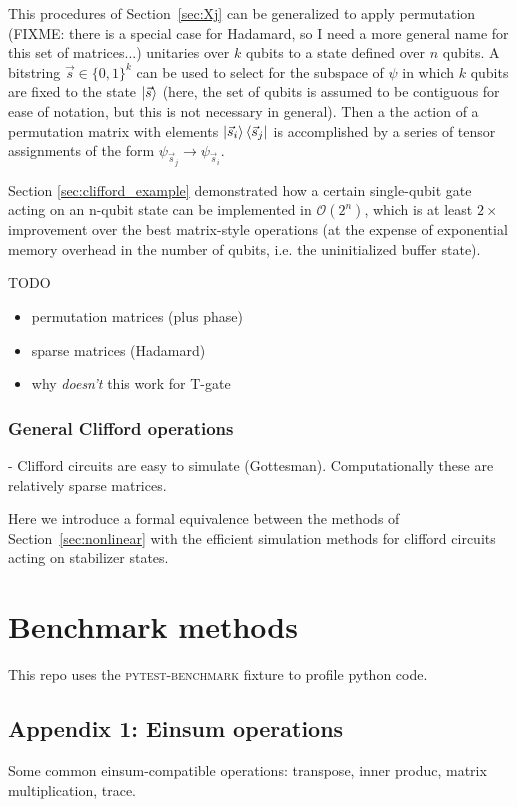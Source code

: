 \documentclass{article}
\begin{document}
This procedures of Section~\ref{sec:Xj} can be generalized to apply permutation (FIXME: there is a special case for Hadamard, so I need a more general name for this set of matrices...) unitaries over $k$ qubits to a state defined over $n$ qubits. A bitstring $\vec{s}\in\{0,1\}^k$ can be used to select for the subspace of $\psi$ in which $k$ qubits are fixed to the state $\ket{\vec{s}}$ (here, the set of qubits is assumed to be contiguous for ease of notation, but this is not necessary in general). Then a the action of a permutation matrix with elements $\ket{\vec{s}_i} \bra{\vec{s}_j}$ is accomplished by a series of tensor assignments of the form $\psi_{\vec{s}_j} \rightarrow \psi_{\vec{s}_i}$.


Section \ref{sec:clifford_example} demonstrated how a certain single-qubit gate acting on an n-qubit state can be implemented in $\mathcal{O}(2^n)$, which is at least $2\times$ improvement over the best matrix-style operations (at the expense of exponential memory overhead in the number of qubits, i.e. the uninitialized buffer state).


TODO
\begin{itemize}
	\item permutation matrices (plus phase)
	\item sparse matrices (Hadamard)
	\item why \textit{doesn't} this work for T-gate
\end{itemize}
\subsubsection{General Clifford operations}
- Clifford circuits are easy to simulate (Gottesman). Computationally these are relatively sparse matrices.

Here we introduce a formal equivalence between the methods of Section~\ref{sec:nonlinear} with the efficient simulation methods for clifford circuits acting on stabilizer states.

\section{Benchmark methods}
This repo uses the \textsc{pytest-benchmark} fixture to profile python code.


\begin{appendices}
\section{Appendix 1: Einsum operations}
\label{sec:a1}

Some common einsum-compatible operations: transpose, inner produc, matrix multiplication, trace.
\end{appendices}
\end{document}
